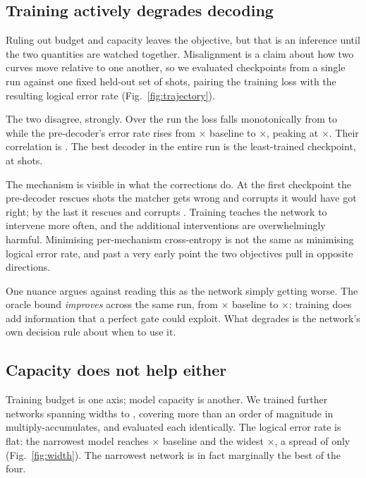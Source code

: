 \documentclass[pdflatex,sn-mathphys-num]{sn-jnl}
\begin{document}
\subsection{Training actively degrades decoding}\label{sec:trajectory}

Ruling out budget and capacity leaves the objective, but that is an inference
until the two quantities are watched together. Misalignment is a claim about
how two curves move relative to one another, so we evaluated \trajPoints{}
checkpoints from a single run against one fixed held-out set of
\trajShots{} shots, pairing the training loss with the resulting logical error
rate (Fig.~\ref{fig:trajectory}).

The two disagree, strongly. Over the run the loss falls monotonically from
\trajFirstLoss{} to \trajLastLoss{} while the pre-decoder's error rate rises
from \trajFirstRatio$\times$ baseline to \trajLastRatio$\times$, peaking at
\trajWorstRatio$\times$. Their correlation is \trajCorr. The best decoder in
the entire run is the least-trained checkpoint, at \trajBestShots{} shots.

The mechanism is visible in what the corrections do. At the first checkpoint
the pre-decoder rescues \trajFirstSaves{} shots the matcher gets wrong and
corrupts \trajFirstBreaks{} it would have got right; by the last it rescues
\trajLastSaves{} and corrupts \trajLastBreaks. Training teaches the network to
intervene more often, and the additional interventions are overwhelmingly
harmful. Minimising per-mechanism cross-entropy is not the same as minimising
logical error rate, and past a very early point the two objectives pull in
opposite directions.

One nuance argues against reading this as the network simply getting worse.
The oracle bound \emph{improves} across the same run, from
\trajFirstOracle$\times$ baseline to \trajLastOracle$\times$: training does add
information that a perfect gate could exploit. What degrades is the network's
own decision rule about when to use it.

\subsection{Capacity does not help either}\label{sec:width}

Training budget is one axis; model capacity is another. We trained
\widthSweepCount{} further networks spanning widths \widthSweepMin{} to
\widthSweepMax, covering more than an order of magnitude in
multiply-accumulates, and evaluated each identically. The logical
error rate is flat: the narrowest model reaches \widthSweepMinRatio$\times$
baseline and the widest \widthSweepMaxRatio$\times$, a spread of only
\widthSweepSpread{} (Fig.~\ref{fig:width}). The narrowest network is in fact
marginally the best of the four.
\end{document}

